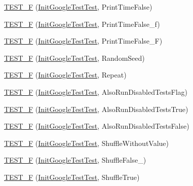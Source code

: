 \begin{DoxyCompactItemize}
\item 
\hyperlink{namespacetesting_a1ec71efef2639ccb137ac5b7ccd8c9d1}{T\-E\-S\-T\-\_\-\-F} (\hyperlink{classtesting_1_1_init_google_test_test}{Init\-Google\-Test\-Test}, Print\-Time\-False)
\item 
\hyperlink{namespacetesting_af87ac7e6dc7c0ea1d85eaa3a57358d29}{T\-E\-S\-T\-\_\-\-F} (\hyperlink{classtesting_1_1_init_google_test_test}{Init\-Google\-Test\-Test}, Print\-Time\-False\-\_\-f)
\item 
\hyperlink{namespacetesting_a337ddb6629adb42219e612b67d18c6f1}{T\-E\-S\-T\-\_\-\-F} (\hyperlink{classtesting_1_1_init_google_test_test}{Init\-Google\-Test\-Test}, Print\-Time\-False\-\_\-\-F)
\item 
\hyperlink{namespacetesting_a2a1e31fea507bdd6e011450e2f316bcf}{T\-E\-S\-T\-\_\-\-F} (\hyperlink{classtesting_1_1_init_google_test_test}{Init\-Google\-Test\-Test}, Random\-Seed)
\item 
\hyperlink{namespacetesting_a254368f412c980556143a9182f451981}{T\-E\-S\-T\-\_\-\-F} (\hyperlink{classtesting_1_1_init_google_test_test}{Init\-Google\-Test\-Test}, Repeat)
\item 
\hyperlink{namespacetesting_ab6624d856abda0913f536a4e719dd769}{T\-E\-S\-T\-\_\-\-F} (\hyperlink{classtesting_1_1_init_google_test_test}{Init\-Google\-Test\-Test}, Also\-Run\-Disabled\-Tests\-Flag)
\item 
\hyperlink{namespacetesting_a3e73dbd19fb50e5ad516de9592963033}{T\-E\-S\-T\-\_\-\-F} (\hyperlink{classtesting_1_1_init_google_test_test}{Init\-Google\-Test\-Test}, Also\-Run\-Disabled\-Tests\-True)
\item 
\hyperlink{namespacetesting_a1c50ef2a972315130f1613c69204e259}{T\-E\-S\-T\-\_\-\-F} (\hyperlink{classtesting_1_1_init_google_test_test}{Init\-Google\-Test\-Test}, Also\-Run\-Disabled\-Tests\-False)
\item 
\hyperlink{namespacetesting_a2f1fd86207e6c7085455dc2d582d1d12}{T\-E\-S\-T\-\_\-\-F} (\hyperlink{classtesting_1_1_init_google_test_test}{Init\-Google\-Test\-Test}, Shuffle\-Without\-Value)
\item 
\hyperlink{namespacetesting_a1acc3dcde65e75293451073528cb1c5a}{T\-E\-S\-T\-\_\-\-F} (\hyperlink{classtesting_1_1_init_google_test_test}{Init\-Google\-Test\-Test}, Shuffle\-False\-\_)
\item 
\hyperlink{namespacetesting_a24bb2b3783b9e0c419db7f974b641cd4}{T\-E\-S\-T\-\_\-\-F} (\hyperlink{classtesting_1_1_init_google_test_test}{Init\-Google\-Test\-Test}, Shuffle\-True)
\item 

\end{DoxyCompactItemize}
